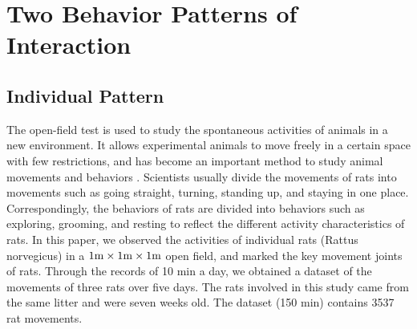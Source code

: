 \section{Two Behavior Patterns of Interaction}
\subsection{Individual Pattern}
The open-field test is used to study the spontaneous activities of animals in a
new environment. It allows experimental animals to move freely in a certain
space with few restrictions, and has become an important method to study animal
movements and behaviors \cite{PRUT20033, EILAM200353}. Scientists usually divide
the movements of rats into movements such as going straight, turning, standing
up, and staying in one place. Correspondingly, the behaviors of rats are divided
into behaviors such as exploring, grooming, and resting to reflect the different
activity characteristics of rats\cite{the_rat_study,whishow_bejavior,
MARSHALL2021420,dunn_profiling}. In this paper, we observed the activities of
individual rats (Rattus norvegicus) in a $1{\rm m}\times 1{\rm m}\times 1{\rm m}
$ open field, and marked the key movement joints of rats. Through the records of
10 min a day, we obtained a dataset of the movements of three rats over five
days. The rats involved in this study came from the same litter and were seven
weeks old. The dataset (150 min) contains 3537 rat movements.

